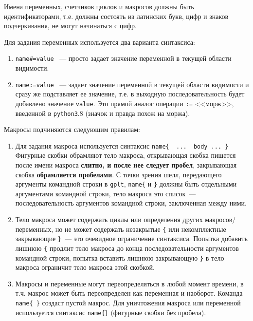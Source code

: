 \documentclass[12pt]{article}
\def\gplt{{\tt gplt}}
\def\python{{\tt python3}}
\begin{document}
Имена переменных, счетчиков циклов и макросов должны быть идентификаторами,
т.е. должны состоять из латинских букв, цифр и знаков подчеркивания, не могут начинаться с цифр.

Для задания переменных используется два варианта синтаксиса:
\begin{enumerate}
\item \verb'name#=value' ~--- просто задает значение переменной в текущей области видимости.
\item \verb'name:=value' ~--- задает значение переменной в текущей области видимости и сразу же подставляет ее значение, т.е. в выходную
  последовательность будет добавлено значение \verb'value'. Это прямой аналог операции \verb':=' <<морж>>, введенной в \python.8  (значок и правда похож на моржа).
\end{enumerate}

Макросы подчиняются следующим правилам:
\begin{enumerate}
\item  Для задания макроса используется синтаксис
\verb'name{  ...  body ... }'
Фигурные скобки обрамляют тело макроса, открывающая скобка пишется после имени макроса {\bf слитно, и после нее следует пробел},
закрывающая скобка {\bf обрамляется пробелами}. С точки зрения шелл, передающего аргументы командной строки в \gplt, \verb'name{'
  и \verb'}' должны быть отдельными аргументами командной строки, тело макроса это список~--- последовательность аргументов командной строки, заключенная между ними.
\item Тело макроса может содержать циклы или определения других макросов/переменных, но не может содержать незакрытые \verb'{' или некомплектные закрывающие \verb'}'~---
это очевидное ограничение синтаксиса. Попытка добавить лишнюю \verb'{' продлит тело макроса до конца последовательности аргументов командной строки,
попытка вставить лишнюю закрывающую \verb'}' в тело макроса ограничит тело макроса этой скобкой. 
\item Макросы и переменные могут переопределяться в любой момент времени, в т.ч. макрос может быть переопределен как переменная и наоборот.
Команда \verb'name{ }' создаст пустой макрос.  Для уничтожения макроса или переменной используется синтаксис \verb'name{}' (фигурные скобки без пробела).
\end{enumerate}
\end{document}
